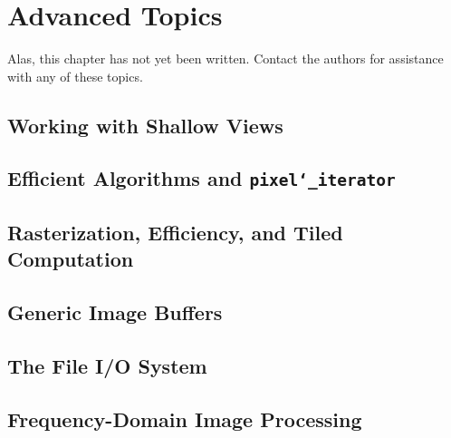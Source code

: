 \chapter{Advanced Topics}\label{ch:advanced-topics}

Alas, this chapter has not yet been written.  Contact the 
authors for assistance with any of these topics.

\section{Working with Shallow Views}\label{sec:advanced.shallow}

\section{Efficient Algorithms and {\tt pixel\char`\_iterator}}

\section{Rasterization, Efficiency, and Tiled Computation}

\section{Generic Image Buffers}\label{sec:advanced.generic}

\section{The File I/O System}\label{sec:advanced.fileio}

\section{Frequency-Domain Image Processing}\label{sec:advanced.frequency}
